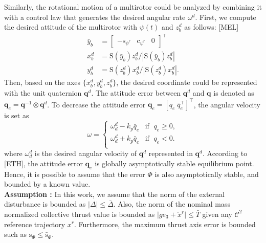 \documentclass[letterpaper, 10 pt, conference]{ieeeconf}  %
\begin{document}
Similarly, the rotational motion of a multirotor could be analyzed by combining it with a control law that generates the desired angular rate $\omega^d$. 
First, we compute the desired attitude of the multirotor with $\psi(t)$ and $z_b^d$ as follows: [MEL]
\begin{align}
\bar{y}_b &= [\begin{array}{ccc}-\text{s}_{\psi^r}&\text{c}_{\psi^r}&0\end{array}]^\top \nonumber \\
x_b^d &= \text{S}(\bar{y}_b)z_b^d / |\text{S}(\bar{y}_b)z_b^d | \nonumber \\ 
y_b^d &= \text{S}({z}_b^d)x_b^d / |\text{S}(z_b^d)x_b^d |. \nonumber  
\end{align}
Then, based on the axes $\{x_b^d,y_b^d,z_b^d\}$, the desired coordinate could be represented with the unit quaternion $\textbf{q}^d$. 
The attitude error between $\textbf{q}^d$ and $\textbf{q}$ is denoted as $\textbf{q}_e = \textbf{q}^{-1}\otimes \textbf{q}^d$. To decrease the attitude error $\textbf{q}_e = [q_e\;\bar{q}_e^\top]^\top$, the angular velocity is set as 
\begin{equation}
\omega = \left\{
\begin{array}{ll}
\omega_d^d - k_p \bar{q}_e & \text{if  }\;q_e \geq 0, \\ 
\omega_d^d + k_p \bar{q}_e & \text{if  }\;q_e < 0. \\ 
\end{array}
\right.
\end{equation}
where $\omega_d^d$ is the desired angular velocity of $\textbf{q}^d$ represented in $\textbf{q}^d$.
According to [ETH], the attitude error $\textbf{q}_e$ is globally asymptotically stable equilibrium point. 
Hence, it is possible to assume that the error $\Phi$ is also asymptotically stable, and bounded by a known value.
\\
\textbf{Assumption : }
In this work, we assume that the norm of the external disturbance is bounded as $|\Delta| \leq \bar{\Delta}$. 
Also, the norm of the nominal mass normalized collective thrust value is bounded as $|ge_3 + \ddot{x}^r| \leq \bar{T}$ given any $\mathcal{C}^2$ reference trajectory $x^r$.  
Furthermore, the maximum thrust axis error is bounded such as $\text{s}_\Phi \leq \bar{\text{s}}_\Phi$.
\end{document}
